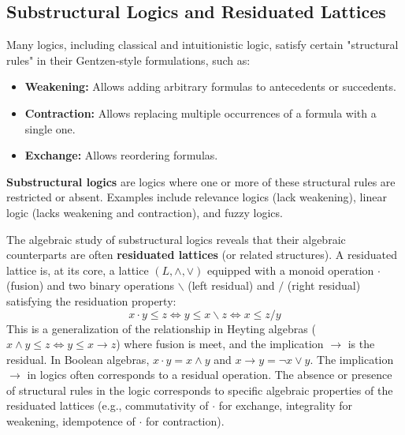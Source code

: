 















\subsection{Substructural Logics and Residuated Lattices}

Many logics, including classical and intuitionistic logic, satisfy certain "structural rules" in their Gentzen-style formulations, such as:
\begin{itemize}
    \item \textbf{Weakening:} Allows adding arbitrary formulas to antecedents or succedents.
    \item \textbf{Contraction:} Allows replacing multiple occurrences of a formula with a single one.
    \item \textbf{Exchange:} Allows reordering formulas.
\end{itemize}
\textbf{Substructural logics} are logics where one or more of these structural rules are restricted or absent. Examples include relevance logics (lack weakening), linear logic (lacks weakening and contraction), and fuzzy logics.

The algebraic study of substructural logics reveals that their algebraic counterparts are often \textbf{residuated lattices} (or related structures).
A residuated lattice is, at its core, a lattice $(L, \land, \lor)$ equipped with a monoid operation $\cdot$ (fusion) and two binary operations $\backslash$ (left residual) and $/$ (right residual) satisfying the residuation property:
\[ x \cdot y \le z \iff y \le x \backslash z \iff x \le z / y \]
This is a generalization of the relationship in Heyting algebras ($x \land y \le z \iff y \le x \to z$) where fusion is meet, and the implication $\to$ is the residual. In Boolean algebras, $x \cdot y = x \land y$ and $x \to y = \neg x \lor y$. The implication $\to$ in logics often corresponds to a residual operation.
The absence or presence of structural rules in the logic corresponds to specific algebraic properties of the residuated lattices (e.g., commutativity of $\cdot$ for exchange, integrality for weakening, idempotence of $\cdot$ for contraction).







